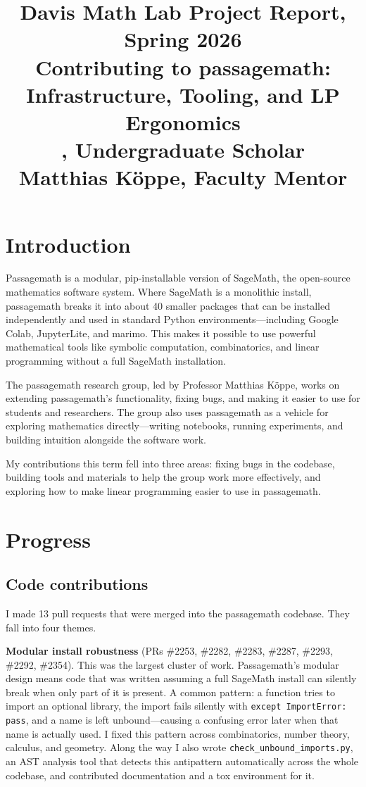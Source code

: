 \documentclass[10pt]{article}
\title{Davis Math Lab Project Report, Spring 2026\\
Contributing to passagemath: Infrastructure, Tooling, and LP Ergonomics\\
[Your Name], Undergraduate Scholar\\
Matthias K\"oppe, Faculty Mentor}
\author{}
\begin{document}
\maketitle
\tableofcontents

\section{Introduction}

Passagemath is a modular, pip-installable version of SageMath, the open-source mathematics
software system. Where SageMath is a monolithic install, passagemath breaks it into about 40
smaller packages that can be installed independently and used in standard Python
environments---including Google Colab, JupyterLite, and marimo. This makes it possible to use
powerful mathematical tools like symbolic computation, combinatorics, and linear programming
without a full SageMath installation.

The passagemath research group, led by Professor Matthias K\"oppe, works on extending
passagemath's functionality, fixing bugs, and making it easier to use for students and
researchers. The group also uses passagemath as a vehicle for exploring mathematics
directly---writing notebooks, running experiments, and building intuition alongside the software
work.

My contributions this term fell into three areas: fixing bugs in the codebase, building tools
and materials to help the group work more effectively, and exploring how to make linear
programming easier to use in passagemath.

\section{Progress}

\subsection{Code contributions}

I made 13 pull requests that were merged into the passagemath codebase. They fall into four
themes.

\textbf{Modular install robustness} (PRs \#2253, \#2282, \#2283, \#2287, \#2293, \#2292,
\#2354). This was the largest cluster of work. Passagemath's modular design means code that was
written assuming a full SageMath install can silently break when only part of it is present. A
common pattern: a function tries to import an optional library, the import fails silently with
\texttt{except ImportError: pass}, and a name is left unbound---causing a confusing error later
when that name is actually used. I fixed this pattern across combinatorics, number theory,
calculus, and geometry. Along the way I also wrote \texttt{check\_unbound\_imports.py}, an AST
analysis tool that detects this antipattern automatically across the whole codebase, and
contributed documentation and a tox environment for it.
\end{document}
